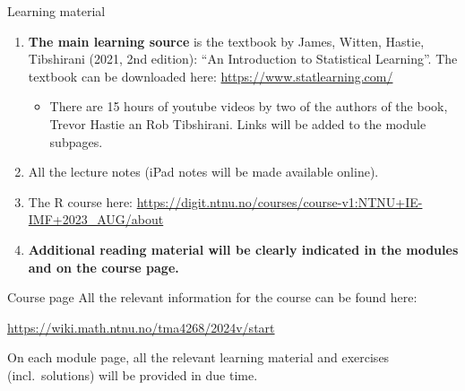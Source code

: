 \documentclass[
  10pt,
  ignorenonframetext,
]{beamer}
\providecommand{\tightlist}{%
  \setlength{\itemsep}{0pt}\setlength{\parskip}{0pt}}
\begin{document}
\begin{frame}{Learning material}
\protect\hypertarget{learning-material}{}
\begin{enumerate}
[1)]
\item
  \textbf{The main learning source} is the textbook by James, Witten,
  Hastie, Tibshirani (2021, 2nd edition): ``An Introduction to
  Statistical Learning''. The textbook can be downloaded here:
  \url{https://www.statlearning.com/}

  \begin{itemize}
  \tightlist
  \item
    There are 15 hours of youtube videos by two of the authors of the
    book, Trevor Hastie an Rob Tibshirani. Links will be added to the
    module subpages.
  \end{itemize}
\item
  All the lecture notes (iPad notes will be made available online).
\item
  The R course here:
  \url{https://digit.ntnu.no/courses/course-v1:NTNU+IE-IMF+2023_AUG/about}
\item
  \textbf{Additional reading material will be clearly indicated in the
  modules and on the course page.}
\end{enumerate}
\end{frame}

\begin{frame}{Course page}
\protect\hypertarget{course-page}{}
All the relevant information for the course can be found here:

\url{https://wiki.math.ntnu.no/tma4268/2024v/start}

On each module page, all the relevant learning material and exercises
(incl.~solutions) will be provided in due time.
\end{frame}
\end{document}
